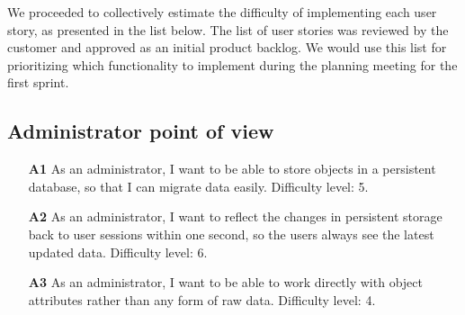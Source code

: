 We proceeded to collectively estimate the difficulty of implementing each user story, as presented in the list below. The list of user stories was reviewed by the customer and approved as an initial product backlog. We would use this list for prioritizing which functionality to implement during the planning meeting for the first sprint.

\subsection*{Administrator point of view}
\begin{itemize}
  \item [\textbf{A1}] As an administrator, I want to be able to store objects in a persistent database, so that I can migrate data easily. Difficulty level: 5.
  \item [\textbf{A2}] As an administrator, I want to reflect the changes in persistent storage back to user sessions within one second, so the users always see the latest updated data. Difficulty level: 6.
  \item [\textbf{A3}] As an administrator, I want to be able to work directly with object attributes rather than any form of raw data. Difficulty level: 4.
\end{itemize}

